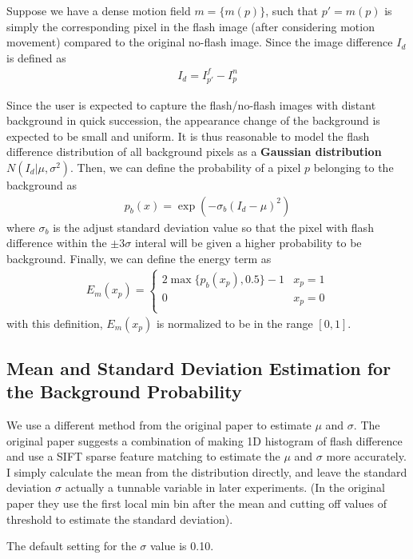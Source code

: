 \documentclass[final]{cvpr}
\begin{document}
Suppose we have a dense motion field $m = \{m(p)\}$, such that 
$p' = m(p)$ is simply the corresponding pixel in the flash image
(after considering motion movement) compared to the original no-flash image.
Since the image difference $I_d$ is defined as 
\begin{align}
   I_d = I_{p'}^f - I_{p}^n
\end{align} 

Since the user is expected to capture the flash/no-flash images
with distant background in quick succession, the appearance
change of the background is expected to be small
and uniform. It is thus reasonable to model the flash difference
distribution of all background pixels as a \textbf{Gaussian
distribution} $N(I_d|\mu, \sigma^2)$. Then, we can define the 
probability of a pixel $p$ belonging to the background as 
\begin{align}
   p_b(x) = \exp(-\sigma_b(I_d - \mu)^2)
\end{align}
where $\sigma_b$ is the adjust standard deviation value so that the 
pixel with flash difference within the $\pm 3\sigma$ interal will be given
a higher probability to be background. Finally, we can define the energy term 
as 
\begin{align}
   E_m(x_p) = 
   \left\{\begin{matrix}
      2\max\{p_b(x_p),0.5\} - 1 & x_p = 1 \\
      0 & x_p = 0 \\
     \end{matrix}
     \right.
\end{align}
with this definition, $E_m(x_p)$ is normalized to be in the range $[0,1]$. 

\subsection{Mean and Standard Deviation Estimation for the Background Probability}
We use a different method from the original paper to estimate $\mu $ and $\sigma$. 
The original paper suggests a combination of making 1D histogram of flash difference 
and use a SIFT sparse feature matching to estimate the $\mu $ and $\sigma$ more accurately.
I simply calculate the mean from the distribution directly, and leave the standard deviation
$\sigma$ actually a tunnable variable in later experiments. (In the original paper they 
use the first local min bin after the mean and cutting off values of threshold to estimate 
the standard deviation). 

The default setting for the $\sigma$ value is 0.10.
\end{document}
